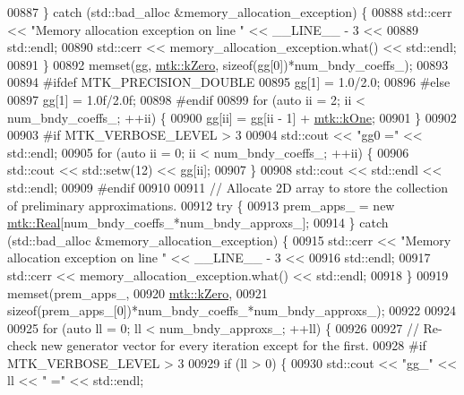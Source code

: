 \begin{DoxyCode}
{{00887   \} \textcolor{keywordflow}{catch} (std::bad\_alloc &memory\_allocation\_exception) \{
00888     std::cerr << \textcolor{stringliteral}{"Memory allocation exception on line "} << \_\_LINE\_\_ - 3 <<
00889       std::endl;
00890     std::cerr << memory\_allocation\_exception.what() << std::endl;
00891   \}
00892   memset(gg, \hyperlink{group__c01-roots_ga59a451a5fae30d59649bcda274fea271}{mtk::kZero}, \textcolor{keyword}{sizeof}(gg[0])*num\_bndy\_coeffs\_);
00893 
00894 \textcolor{preprocessor}{  #ifdef MTK\_PRECISION\_DOUBLE}
00895   gg[1] = 1.0/2.0;
00896 \textcolor{preprocessor}{  #else}
00897   gg[1] = 1.0f/2.0f;
00898 \textcolor{preprocessor}{  #endif}
00899   \textcolor{keywordflow}{for} (\textcolor{keyword}{auto} ii = 2; ii < num\_bndy\_coeffs\_; ++ii) \{
00900     gg[ii] = gg[ii - 1] + \hyperlink{group__c01-roots_ga26407c24d43b6b95480943340d285c71}{mtk::kOne};
00901   \}
00902 
00903 \textcolor{preprocessor}{  #if MTK\_VERBOSE\_LEVEL > 3}
00904   std::cout << \textcolor{stringliteral}{"gg0 ="} << std::endl;
00905   \textcolor{keywordflow}{for} (\textcolor{keyword}{auto} ii = 0; ii < num\_bndy\_coeffs\_; ++ii) \{
00906     std::cout << std::setw(12) << gg[ii];
00907   \}
00908   std::cout << std::endl << std::endl;
00909 \textcolor{preprocessor}{  #endif}
00910 
00911   \textcolor{comment}{// Allocate 2D array to store the collection of preliminary approximations.}
00912   \textcolor{keywordflow}{try} \{
00913     prem\_apps\_ = \textcolor{keyword}{new} \hyperlink{group__c01-roots_gac080bbbf5cbb5502c9f00405f894857d}{mtk::Real}[num\_bndy\_coeffs\_*num\_bndy\_approxs\_];
00914   \} \textcolor{keywordflow}{catch} (std::bad\_alloc &memory\_allocation\_exception) \{
00915     std::cerr << \textcolor{stringliteral}{"Memory allocation exception on line "} << \_\_LINE\_\_ - 3 <<
00916 std::endl;
00917     std::cerr << memory\_allocation\_exception.what() << std::endl;
00918   \}
00919   memset(prem\_apps\_,
00920          \hyperlink{group__c01-roots_ga59a451a5fae30d59649bcda274fea271}{mtk::kZero},
00921          \textcolor{keyword}{sizeof}(prem\_apps\_[0])*num\_bndy\_coeffs\_*num\_bndy\_approxs\_);
00922 
00924 
00925   \textcolor{keywordflow}{for} (\textcolor{keyword}{auto} ll = 0; ll < num\_bndy\_approxs\_; ++ll) \{
00926 
00927     \textcolor{comment}{// Re-check new generator vector for every iteration except for the first.}
00928 \textcolor{preprocessor}{    #if MTK\_VERBOSE\_LEVEL > 3}
00929     \textcolor{keywordflow}{if} (ll > 0) \{
00930       std::cout << \textcolor{stringliteral}{"gg\_"} << ll << \textcolor{stringliteral}{" ="} << std::endl;
}}
\end{DoxyCode}
